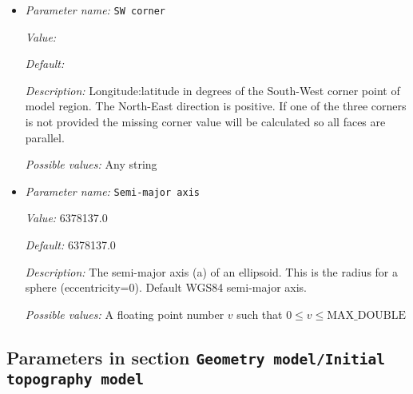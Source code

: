 \begin{itemize}
{\it Value:} 


{\it Default:} 


{\it Description:} Longitude:latitude in degrees of the South-East corner point of model region. The North-East direction is positive. If one of the three corners is not provided the missing corner value will be calculated so all faces are parallel.


{\it Possible values:} Any string
\item {\it Parameter name:} {\tt SW corner}
\label{parameters:Geometry model/Ellipsoidal chunk/SW corner}


{\it Value:} 


{\it Default:} 


{\it Description:} Longitude:latitude in degrees of the South-West corner point of model region. The North-East direction is positive. If one of the three corners is not provided the missing corner value will be calculated so all faces are parallel.


{\it Possible values:} Any string
\item {\it Parameter name:} {\tt Semi-major axis}
\label{parameters:Geometry model/Ellipsoidal chunk/Semi-major axis}


{\it Value:} 6378137.0


{\it Default:} 6378137.0


{\it Description:} The semi-major axis (a) of an ellipsoid. This is the radius for a sphere (eccentricity=0). Default WGS84 semi-major axis.


{\it Possible values:} A floating point number $v$ such that $0 \leq v \leq \text{MAX\_DOUBLE}$
\end{itemize}

\subsection{Parameters in section \tt Geometry model/Initial topography model}
\label{parameters:Geometry_20model/Initial_20topography_20model}

